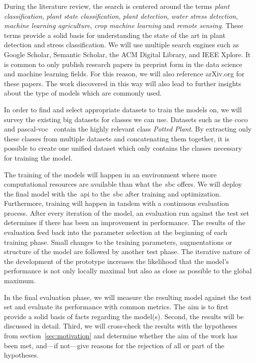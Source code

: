 \documentclass[draft,final]{vutinfth} %
\begin{document}
During the literature review, the search is centered around the terms
\emph{plant classification}, \emph{plant state classification},
\emph{plant detection}, \emph{water stress detection}, \emph{machine
learning agriculture}, \emph{crop machine learning} and \emph{remote
sensing}. These terms provide a solid basis for understanding the
state of the art in plant detection and stress classification. We will
use multiple search engines such as Google Scholar, Semantic Scholar,
the ACM Digital Library, and IEEE Xplore. It is common to only publish
research papers in preprint form in the data science and machine
learning fields. For this reason, we will also reference arXiv.org for
these papers. The work discovered in this way will also lead to
further insights about the type of models which are commonly used.

In order to find and select appropriate datasets to train the models
on, we will survey the existing big datasets for classes we can
use. Datasets such as the \gls{coco}~\cite{lin2015} and
\gls{pascal-voc}~\cite{everingham2010} contain the highly relevant
class \emph{Potted Plant}. By extracting only these classes from
multiple datasets and concatenating them together, it is possible to
create one unified dataset which only contains the classes necessary
for training the model.

The training of the models will happen in an environment where more
computational resources are available than what the~\gls{sbc}
offers. We will deploy the final model with the~\gls{api} to
the~\gls{sbc} after training and optimization. Furthermore, training
will happen in tandem with a continuous evaluation process. After
every iteration of the model, an evaluation run against the test set
determines if there has been an improvement in performance. The
results of the evaluation feed back into the parameter selection at
the beginning of each training phase. Small changes to the training
parameters, augmentations or structure of the model are followed by
another test phase. The iterative nature of the development of the
prototype increases the likelihood that the model's performance is not
only locally maximal but also as close as possible to the global
maximum.

In the final evaluation phase, we will measure the resulting model
against the test set and evaluate its performance with common
metrics. The aim is to first provide a solid basis of facts regarding
the model(s). Second, the results will be discussed in detail. Third,
we will cross-check the results with the hypotheses from
section~\ref{sec:motivation} and determine whether the aim of the work
has been met, and—if not—give reasons for the rejection of all or part
of the hypotheses.
\end{document}
